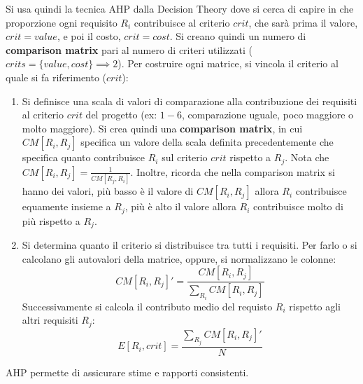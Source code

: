 Si usa quindi la tecnica AHP dalla Decision Theory dove si cerca di capire in che
proporzione ogni requisito $R_i$ contribuisce al criterio $crit$, che sarà prima
il valore, $crit = value$, e poi il costo, $crit = cost$. Si creano quindi un numero
di \textbf{comparison matrix} pari al numero di criteri utilizzati ($crits = \{value, cost\} \implies 2$).
Per costruire ogni matrice, si vincola il criterio al quale si fa riferimento ($crit$):
\begin{enumerate}
      \item Si definisce una scala di valori di comparazione alla contribuzione dei requisiti al
            criterio $crit$ del progetto (ex: $1-6$, comparazione uguale, poco maggiore o molto maggiore).
            Si crea quindi una \textbf{comparison matrix}, in cui $CM[R_i,R_j]$
            specifica un valore della scala definita precedentemente che specifica
            quanto contribuisce $R_i$ sul criterio $crit$ rispetto a $R_j$.
            Nota che $CM[R_i, R_j] = \frac{1}{CM[R_j, R_i]}$. Inoltre, ricorda che
            nella comparison matrix si hanno dei valori, più basso è il valore
            di $CM[R_i, R_j] $ allora $R_i$ contribuisce equamente insieme a $R_j$, più
            è alto il valore allora $R_i$ contribuisce molto di più rispetto a $R_j$.
      \item Si determina quanto il criterio si distribuisce tra tutti i requisiti.
            Per farlo o si calcolano gli autovalori della matrice, oppure, si
            normalizzano le colonne:
            \begin{equation}
                  CM[R_i, R_j]' = \frac{CM[R_i, R_j]}{\sum_{R_i} CM[R_i, R_j]}
            \end{equation}
            Successivamente si calcola il contributo medio del requisto $R_i$
            rispetto agli altri requisiti $R_j$:
            \begin{equation}
                  E[R_i, crit] = \frac{\sum_{R_j} CM[R_i, R_j]'}{N}
            \end{equation}
\end{enumerate}
AHP permette di assicurare stime e rapporti consistenti.
